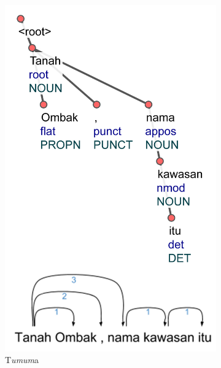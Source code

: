 \begin{figure}
\centering

\begin{subfigure}{.32\linewidth}
  \centering
  \includegraphics[width=1\linewidth] {pics/ts6841.jpg} 
	\caption{T\textit{umum}a}
	\label{fig:ts6841} 
\end{subfigure}
%
\begin{subfigure}{.46\linewidth}
  \centering

\end{subfigure}
\end{figure}

